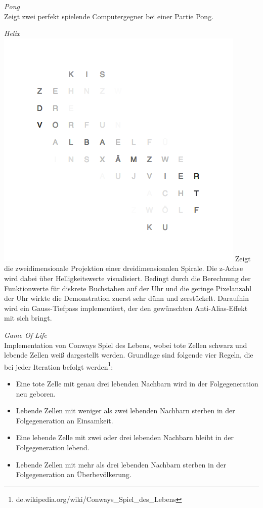 \emph{Pong} \\
Zeigt zwei perfekt spielende Computergegner bei einer Partie Pong.

\emph{Helix} \\
\includegraphics[width=\columnwidth]{Abbildungen/Demo/Helix}
Zeigt die zweidimensionale Projektion einer dreidimensionalen Spirale. Die z-Achse wird dabei über Helligkeitswerte visualisiert.
Bedingt durch die Berechnung der Funktionwerte für diskrete Buchstaben auf der Uhr und die geringe Pixelanzahl der Uhr wirkte die Demonstration zuerst sehr dünn und zerstückelt.
Daraufhin wird ein Gauss-Tiefpass implementiert, der den gewünschten Anti-Alias-Effekt mit sich bringt.

\emph{Game Of Life} \\
Implementation von Conways Spiel des Lebens, wobei tote Zellen schwarz und lebende Zellen weiß dargestellt werden.
Grundlage sind folgende vier Regeln, die bei jeder Iteration befolgt werden\footnote{de.wikipedia.org/wiki/Conways\_Spiel\_des\_Lebens}:
\begin{itemize}
    \item Eine tote Zelle mit genau drei lebenden Nachbarn wird in der Folgegeneration neu geboren.
    \item Lebende Zellen mit weniger als zwei lebenden Nachbarn sterben in der Folgegeneration an Einsamkeit.
    \item Eine lebende Zelle mit zwei oder drei lebenden Nachbarn bleibt in der Folgegeneration lebend.
    \item Lebende Zellen mit mehr als drei lebenden Nachbarn sterben in der Folgegeneration an Überbevölkerung.
\end{itemize}

